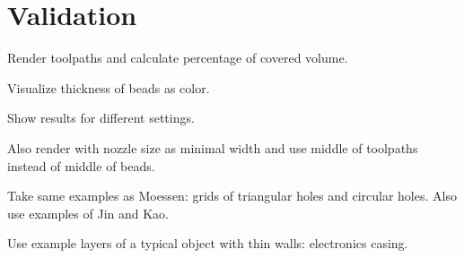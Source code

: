 \section{Validation}
Render toolpaths and calculate percentage of covered volume.

Visualize thickness of beads as color.

Show results for different settings.

Also render with nozzle size as minimal width and use middle of toolpaths instead of middle of beads.

Take same examples as Moessen: grids of triangular holes and circular holes.
Also use examples of Jin and Kao.

Use example layers of a typical object with thin walls: electronics casing.
